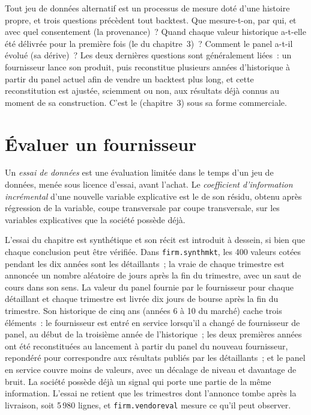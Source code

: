 Tout jeu de données alternatif est un processus de mesure doté d'une histoire propre, et trois questions précèdent tout backtest. Que
mesure-t-on, par qui, et avec quel consentement (la provenance)~? Quand chaque valeur historique a-t-elle été délivrée pour la première fois (le
 du chapitre~3)~? Comment le panel a-t-il évolué (sa dérive)~? Les deux dernières questions sont généralement liées~: un fournisseur lance son produit, puis reconstitue plusieurs années
d'historique à partir du panel actuel afin de vendre un backtest plus long, et cette reconstitution est ajustée, sciemment ou non, aux résultats déjà
connus au moment de sa construction. C'est le  (chapitre~3) sous sa forme commerciale.

\section{Évaluer un fournisseur}

\begin{definition}\label{def:rs:alternative-and-text-data:trial}
Un \emph{essai de données} est une évaluation limitée dans le temps d'un jeu de données, menée sous licence d'essai, avant l'achat. Le
\emph{coefficient d'information incrémental} d'une nouvelle variable explicative est le 
de son résidu, obtenu après régression de la variable, coupe transversale par coupe transversale, sur les variables explicatives que la société possède déjà.
\end{definition}

L'essai du chapitre est synthétique et son récit est introduit à dessein, si bien que chaque conclusion peut être vérifiée. Dans \texttt{firm.synthmkt}, les 400 valeurs
cotées pendant les dix années sont les détaillants~; la vraie  de chaque trimestre est annoncée un nombre aléatoire de jours après la
fin du trimestre, avec un saut de cours dans son sens. La valeur du panel fournie par le fournisseur pour chaque détaillant et chaque trimestre est livrée dix jours de bourse
après la fin du trimestre. Son historique de cinq ans (années 6 à 10 du marché) cache trois éléments~: le fournisseur est entré en service lorsqu'il a changé
de fournisseur de panel, au début de la troisième année de l'historique~; les deux premières années ont été reconstituées au lancement à partir du panel du nouveau fournisseur,
repondéré pour correspondre aux résultats publiés par les détaillants~; et le panel en service couvre moins de valeurs, avec un décalage de niveau et davantage de bruit. La société
possède déjà un signal qui porte une partie de la même information. L'essai ne retient que les trimestres dont l'annonce tombe après la
livraison, soit 5\,980 lignes, et \texttt{firm.vendoreval} mesure ce qu'il peut observer.

